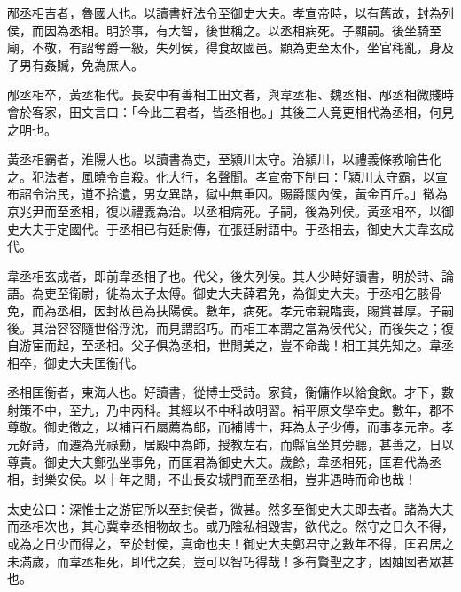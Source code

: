 \begin{pinyinscope}
邴丞相吉者，魯國人也。以讀書好法令至御史大夫。孝宣帝時，以有舊故，封為列侯，而因為丞相。明於事，有大智，後世稱之。以丞相病死。子顯嗣。後坐騎至廟，不敬，有詔奪爵一級，失列侯，得食故國邑。顯為吏至太仆，坐官秏亂，身及子男有姦贓，免為庶人。

邴丞相卒，黃丞相代。長安中有善相工田文者，與韋丞相、魏丞相、邴丞相微賤時會於客家，田文言曰：「今此三君者，皆丞相也。」其後三人竟更相代為丞相，何見之明也。

黃丞相霸者，淮陽人也。以讀書為吏，至潁川太守。治潁川，以禮義條教喻告化之。犯法者，風曉令自殺。化大行，名聲聞。孝宣帝下制曰：「潁川太守霸，以宣布詔令治民，道不拾遺，男女異路，獄中無重囚。賜爵關內侯，黃金百斤。」徵為京兆尹而至丞相，復以禮義為治。以丞相病死。子嗣，後為列侯。黃丞相卒，以御史大夫于定國代。于丞相已有廷尉傳，在張廷尉語中。于丞相去，御史大夫韋玄成代。

韋丞相玄成者，即前韋丞相子也。代父，後失列侯。其人少時好讀書，明於詩、論語。為吏至衛尉，徙為太子太傅。御史大夫薛君免，為御史大夫。于丞相乞骸骨免，而為丞相，因封故邑為扶陽侯。數年，病死。孝元帝親臨喪，賜賞甚厚。子嗣後。其治容容隨世俗浮沈，而見謂諂巧。而相工本謂之當為侯代父，而後失之；復自游宦而起，至丞相。父子俱為丞相，世閒美之，豈不命哉！相工其先知之。韋丞相卒，御史大夫匡衡代。

丞相匡衡者，東海人也。好讀書，從博士受詩。家貧，衡傭作以給食飲。才下，數射策不中，至九，乃中丙科。其經以不中科故明習。補平原文學卒史。數年，郡不尊敬。御史徵之，以補百石屬薦為郎，而補博士，拜為太子少傅，而事孝元帝。孝元好詩，而遷為光祿勳，居殿中為師，授教左右，而縣官坐其旁聽，甚善之，日以尊貴。御史大夫鄭弘坐事免，而匡君為御史大夫。歲餘，韋丞相死，匡君代為丞相，封樂安侯。以十年之閒，不出長安城門而至丞相，豈非遇時而命也哉！

太史公曰：深惟士之游宦所以至封侯者，微甚。然多至御史大夫即去者。諸為大夫而丞相次也，其心冀幸丞相物故也。或乃陰私相毀害，欲代之。然守之日久不得，或為之日少而得之，至於封侯，真命也夫！御史大夫鄭君守之數年不得，匡君居之未滿歲，而韋丞相死，即代之矣，豈可以智巧得哉！多有賢聖之才，困妯囡者眾甚也。


\end{pinyinscope}